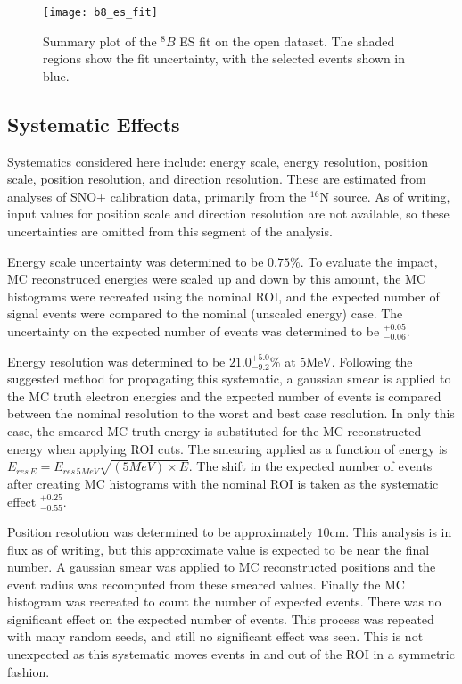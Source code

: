 \begin{figure}
\centering
\texttt{[image: b8\_es\_fit]}
\caption{Summary plot of the $^8B$ ES fit on the open dataset.
         The shaded regions show the fit uncertainty, with the selected events
         shown in blue.}
\label{fig:solar:openfit}
\end{figure}

\subsection{Systematic Effects}
Systematics considered here include: energy scale, energy resolution, position 
scale, position resolution, and direction resolution.
These are estimated from analyses of SNO+ calibration data, primarily from the $^{16}$N source.
As of writing, input values for position scale and direction resolution are not
available, so these uncertainties are omitted from this segment of the analysis.

Energy scale uncertainty was determined to be $0.75\%$. To evaluate the impact,
MC reconstruced energies were scaled up and down by this amount, the MC histograms 
were recreated using the nominal ROI, and the expected number of signal events 
were compared to the nominal (unscaled energy) case. The uncertainty on the 
expected number of events was determined to be $^{+0.05}_{-0.06}$.

Energy resolution was determined to be $21.0^{+5.0}_{-9.2}\%$ at 5MeV.
Following the suggested method for propagating this systematic, a gaussian smear is applied to the MC truth electron energies
and the expected number of events is compared between the nominal resolution to the worst and best case resolution. In 
only this case, the smeared MC truth energy is substituted for the MC reconstructed
energy when applying ROI cuts. The smearing applied as a function of energy is
$E_{res\,E} = E_{res\,5MeV} \sqrt{(5 MeV) \times E}$. The shift in the expected 
number of events after creating MC histograms with the nominal ROI is taken as 
the systematic effect $^{+0.25}_{-0.55}$.


Position resolution was determined to be approximately $10$cm. This analysis
is in flux as of writing, but this approximate value is expected to be near
the final number. A gaussian smear was applied to MC reconstructed positions 
and the event radius was recomputed from these smeared values. Finally the MC 
histogram was recreated to count the number of expected events. There was no 
significant effect on the expected number of events. This process was repeated
with many random seeds, and still no significant effect was seen. This is not
unexpected as this systematic moves events in and out of the ROI in a symmetric
fashion.

